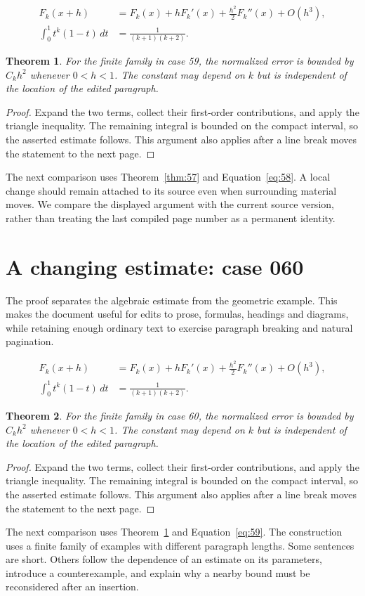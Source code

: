 \documentclass[a4paper,10pt]{article}
\newtheorem{theorem}{Theorem}[section]
\begin{document}
\lipsum[25-26]
\begin{align}\label{eq:58}
 F_k(x+h)&=F_k(x)+hF_k'(x)+\frac{h^2}{2}F_k''(x)+O(h^3),\\
 \int_0^1 t^k(1-t)\,dt&=\frac{1}{(k+1)(k+2)}.
\end{align}
\begin{theorem}\label{thm:58}
For the finite family in case 59, the normalized error is bounded by $C_k h^2$ whenever $0<h<1$. The constant may depend on $k$ but is independent of the location of the edited paragraph.
\end{theorem}
\begin{proof}
Expand the two terms, collect their first-order contributions, and apply the
triangle inequality. The remaining integral is bounded on the compact interval,
so the asserted estimate follows. This argument also applies after a line break
moves the statement to the next page.
\end{proof}
The next comparison uses Theorem~\ref{thm:57} and Equation~\ref{eq:58}. A local change should remain attached to its source even when surrounding material moves. We compare the displayed argument with the current source version, rather than treating the last compiled page number as a permanent identity.

\lipsum[18]

\section{A changing estimate: case 060}\label{unit:59}
The proof separates the algebraic estimate from the geometric example. This makes the document useful for edits to prose, formulas, headings and diagrams, while retaining enough ordinary text to exercise paragraph breaking and natural pagination.

\lipsum[28-29]
\begin{align}\label{eq:59}
 F_k(x+h)&=F_k(x)+hF_k'(x)+\frac{h^2}{2}F_k''(x)+O(h^3),\\
 \int_0^1 t^k(1-t)\,dt&=\frac{1}{(k+1)(k+2)}.
\end{align}
\begin{theorem}\label{thm:59}
For the finite family in case 60, the normalized error is bounded by $C_k h^2$ whenever $0<h<1$. The constant may depend on $k$ but is independent of the location of the edited paragraph.
\end{theorem}
\begin{proof}
Expand the two terms, collect their first-order contributions, and apply the
triangle inequality. The remaining integral is bounded on the compact interval,
so the asserted estimate follows. This argument also applies after a line break
moves the statement to the next page.
\end{proof}
The next comparison uses Theorem~\ref{thm:58} and Equation~\ref{eq:59}. The construction uses a finite family of examples with different paragraph lengths. Some sentences are short. Others follow the dependence of an estimate on its parameters, introduce a counterexample, and explain why a nearby bound must be reconsidered after an insertion.
\end{document}
